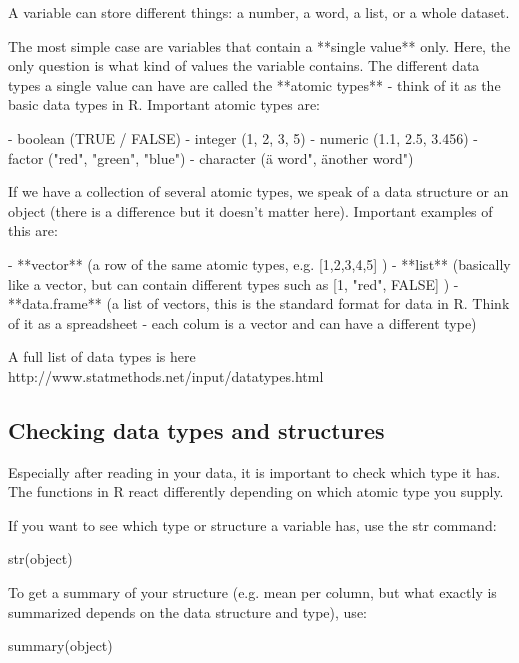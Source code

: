 \documentclass[a4paper,twoside]{tufte-book}\usepackage[]{graphicx}\usepackage[]{color}
\begin{document}
\begin{appendices}
A variable can store different things: a number, a word, a list, or a whole dataset. 

The most simple case are variables that contain a **single value** only. Here, the only question is what kind of values the variable contains. The different data types a single value can have are called the **atomic types** - think of it as the basic data types in R. Important atomic types are: 

- boolean (TRUE / FALSE)
- integer (1, 2, 3, 5)
- numeric (1.1, 2.5, 3.456)
- factor ("red", "green", "blue")
- character (ä word", änother word")

If we have a collection of several atomic types, we speak of a data structure or an object (there is a difference but it doesn't matter here). Important examples of this are: 

- **vector** (a row of the same atomic types, e.g. [1,2,3,4,5] )
- **list** (basically like a vector, but can contain different types such as [1, "red", FALSE] )
- **data.frame** (a list of vectors, this is the standard format for data in R. Think of it as a spreadsheet - each colum is a vector and can have a different type)

A full list of data types is here http://www.statmethods.net/input/datatypes.html 
 
\subsection{Checking data types and structures}

Especially after reading in your data, it is important to check which type it has. The functions in R react differently depending on which atomic type you supply. 

If you want to see which type or structure a variable has, use the str command:

\begin{Schunk}
\begin{Sinput}
str(object)
\end{Sinput}
\end{Schunk}

To get a summary of your structure (e.g. mean per column, but what exactly is summarized depends on the data structure and type), use:

\begin{Schunk}
\begin{Sinput}
summary(object)
\end{Sinput}
\end{Schunk}


\end{appendices}
\end{document}
